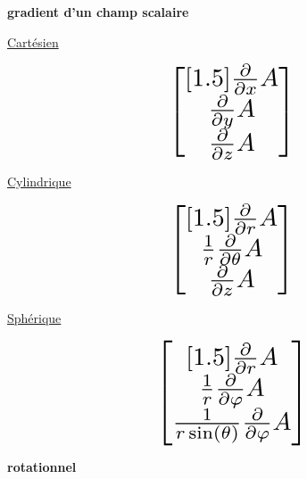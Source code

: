 \documentclass{article}
\newcommand{\vtab} {\vspace{0.4cm}}
\begin{document}
\newpage

\vtab
\vtab
\vtab

\begin{center}
	{\huge \textbf{gradient d'un champ scalaire}}
\end{center}

\vtab

\begin{center}
\begin{multicols}{3}
		{\Large \underline{Cartésien}} \\
\vtab

			$$\scalebox{2}{$\displaystyle \begin{bmatrix}[1.5] \frac{\partial}{\partial x} A \\ \frac{\partial}{\partial y} A \\ \frac{\partial}{\partial z} A \end{bmatrix}$}$$

	\columnbreak
		{\Large \underline{Cylindrique}} \\

\vtab

			$$\scalebox{2}{$\displaystyle \begin{bmatrix}[1.5] \frac{\partial}{\partial r} A \\ \frac{1}{r}\frac{\partial}{\partial \theta} A \\ \frac{\partial}{\partial z} A \end{bmatrix}$}$$

	
	\columnbreak
		{\Large \underline{Sphérique}} \\

\vtab

			$$\scalebox{2}{$\displaystyle \begin{bmatrix}[1.5] \frac{\partial}{\partial r} A \\ \frac{1}{r}\frac{\partial}{\partial \varphi} A \\ \frac{1}{r \sin (\theta)} \frac{\partial}{\partial \varphi} A \end{bmatrix}$}$$
\end{multicols}
\end{center}


\vtab
\vtab

\begin{center}
	{\huge \textbf{rotationnel}}
\end{center}

\vtab
\end{document}
